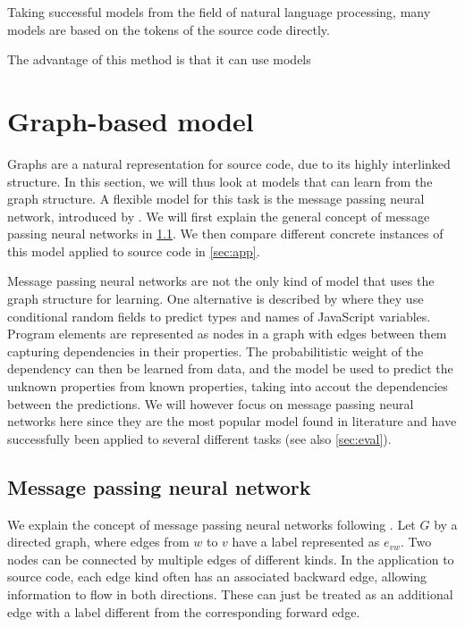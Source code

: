 \documentclass[sigconf,authordraft=true,nonacm=true]{acmart}
\begin{document}
Taking successful models from the field of natural language processing, many models are based on the tokens of the source code directly.

The advantage of this method is that it can use models



\section{Graph-based model}
Graphs are a natural representation for source code, due to its highly interlinked structure.
In this section, we will thus look at models that can learn from the graph structure.
A flexible model for this task is the message passing neural network, introduced by \citet{gilmer_neural_2017}.
We will first explain the general concept of message passing neural networks in \cref{sec:mpnn}.
We then compare different concrete instances of this model applied to source code in \cref{sec:app}.

Message passing neural networks are not the only kind of model that uses the graph structure for learning.
One alternative is described by \citet{raychev_predicting_2019} where they use conditional random fields to predict types and names of JavaScript variables.
Program elements are represented as nodes in a graph with edges between them capturing dependencies in their properties.
The probabilitistic weight of the dependency can then be learned from data, and the model be used to predict the unknown properties from known properties, taking into accout the dependencies between the predictions.
We will however focus on message passing neural networks here since they are the most popular model found in literature and have successfully been applied to several different tasks (see also \cref{sec:eval}).

\subsection{Message passing neural network}\label{sec:mpnn}
We explain the concept of message passing neural networks following \citet{gilmer_neural_2017}.
Let $G$ by a directed graph, where edges from $w$ to $v$ have a label represented as $e_{vw}$.
Two nodes can be connected by multiple edges of different kinds.
In the application to source code, each edge kind often has an associated backward edge, allowing information to flow in both directions.
These can just be treated as an additional edge with a label different from the corresponding forward edge.
\end{document}
